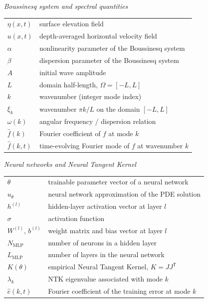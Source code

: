 \vspace{0.5cm}
\noindent\textit{Boussinesq system and spectral quantities}\\[2pt]
\noindent
\begin{tabular}{@{}p{2.6cm}p{12cm}@{}}
    $\eta(x,t)$      & surface elevation field \\[2pt]
    $u(x,t)$         & depth-averaged horizontal velocity field \\[2pt]
    $\alpha$         & nonlinearity parameter of the Boussinesq system \\[2pt]
    $\beta$          & dispersion parameter of the Boussinesq system \\[2pt]
    $A$              & initial wave amplitude \\[2pt]
    $L$              & domain half-length, $\Omega = [-L, L]$ \\[2pt]
    $k$              & wavenumber (integer mode index) \\[2pt]
    $\xi_k$          & wavenumber $\pi k / L$ on the domain $[-L,L]$ \\[2pt]
    $\omega(k)$      & angular frequency / dispersion relation \\[2pt]
    $\hat{f}(k)$     & Fourier coefficient of $f$ at mode $k$ \\[2pt]
    $\hat{f}(k,t)$   & time-evolving Fourier mode of $f$ at wavenumber $k$ \\
\end{tabular}

\vspace{0.5cm}
\noindent\textit{Neural networks and Neural Tangent Kernel}\\[2pt]
\noindent
\begin{tabular}{@{}p{2.6cm}p{12cm}@{}}
    $\theta$         & trainable parameter vector of a neural network \\[2pt]
    $u_{\theta}$     & neural network approximation of the PDE solution \\[2pt]
    $h^{(l)}$        & hidden-layer activation vector at layer $l$ \\[2pt]
    $\sigma$         & activation function \\[2pt]
    $W^{(l)},\,b^{(l)}$ & weight matrix and bias vector at layer $l$ \\[2pt]
    $N_{\mathrm{MLP}}$ & number of neurons in a hidden layer \\[2pt]
    $L_{\mathrm{MLP}}$ & number of layers in the neural network \\[2pt]
    $K(\theta)$      & empirical Neural Tangent Kernel, $K = J J^{\mathsf{T}}$ \\[2pt]
    $\lambda_k$      & NTK eigenvalue associated with mode $k$ \\[2pt]
    $\hat{e}(k,t)$   & Fourier coefficient of the training error at mode $k$ \\
\end{tabular}

